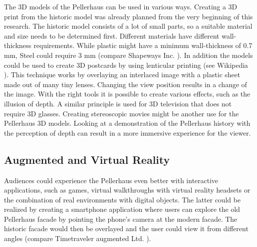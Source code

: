 The 3D models of the Pellerhaus can be used in various ways. Creating a 3D print from the historic model was already planned from the very beginning of this research. The historic model consists of a lot of small parts, so a suitable material and size needs to be determined first. Different materials have different wall-thickness requirements. While plastic might have a minimum wall-thickness of 0.7 mm, Steel could require 3 mm (compare Shapeways Inc. \parencite{3dprinting_materials}). In addition the models could be used to create 3D postcards by using lenticular printing (see Wikipedia \parencite{wiki:lenticular_printing}). This technique works by overlaying an interlaced image with a plastic sheet made out of many tiny lenses. Changing the view position results in a change of the image. With the right tools it is possible to create various effects, such as the illusion of depth. A similar principle is used for 3D television that does not require 3D glasses. Creating stereoscopic movies might be another use for the Pellerhaus 3D models. Looking at a demonstration of the Pellerhaus history with the perception of depth can result in a more immersive experience for the viewer.

\subsection{Augmented and Virtual Reality}

Audiences could experience the Pellerhaus even better with interactive applications, such as games, virtual walkthroughs with virtual reality headsets or the combination of real environments with digital objects. The latter could be realized by creating a smartphone application where users can explore the old Pellerhaus facade by pointing the phone's camera at the modern facade. The historic facade would then be overlayed and the user could view it from different angles (compare Timetraveler augmented Ltd. \parencite{ytTimeTraveler} ).

